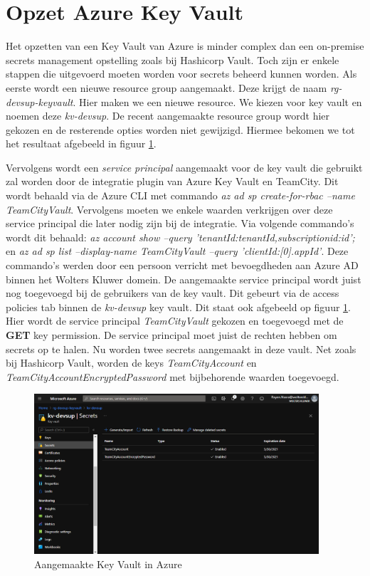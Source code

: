 \newpage
\section{Opzet Azure Key Vault}
\label{ch:azurekey}

Het opzetten van een Key Vault van Azure is minder complex dan een on-premise secrets management opstelling zoals bij Hashicorp Vault. Toch zijn er enkele stappen die uitgevoerd moeten worden voor secrets beheerd kunnen worden. Als eerste wordt een nieuwe resource group aangemaakt. Deze krijgt de naam \textit{rg-devsup-keyvault}. Hier maken we een nieuwe resource. We kiezen voor key vault en noemen deze \textit{kv-devsup}. De recent aangemaakte resource group wordt hier gekozen en de resterende opties worden niet gewijzigd. Hiermee bekomen we tot het resultaat afgebeeld in figuur \ref{fig:azure}.

Vervolgens wordt een \textit{service principal} aangemaakt voor de key vault die gebruikt zal worden door de integratie plugin van Azure Key Vault en TeamCity. Dit wordt behaald via de Azure CLI met commando \textit{az ad sp create-for-rbac --name TeamCityVault}. Vervolgens moeten we enkele waarden verkrijgen over deze service principal die later nodig zijn bij de integratie. Via volgende commando's wordt dit behaald: \textit{az account show --query '{tenantId:tenantId,subscriptionid:id}';} en \textit{az ad sp list --display-name TeamCityVault --query '{clientId:[0].appId}'}. Deze commando's werden door een persoon verricht met bevoegdheden aan Azure AD binnen het Wolters Kluwer domein. De aangemaakte service principal wordt juist nog toegevoegd bij de gebruikers van de key vault. Dit gebeurt via de access policies tab binnen de \textit{kv-devsup} key vault. Dit staat ook afgebeeld op figuur \ref{fig:azure}. Hier wordt de service principal \textit{TeamCityVault} gekozen en toegevoegd met de \textbf{GET} key permission. De service principal moet juist de rechten hebben om secrets op te halen. Nu worden twee secrets aangemaakt in deze vault. Net zoals bij Hashicorp Vault, worden de keys \textit{TeamCityAccount} en \textit{TeamCityAccountEncryptedPassword} met bijbehorende waarden toegevoegd.
\begin{figure}[htbp]
\centerline{\includegraphics[width=400]{bachproef/img/poc/azurekeyvault.png}}
\caption{Aangemaakte Key Vault in Azure \autocite{azure}}
\label{fig:azure}
\end{figure}

